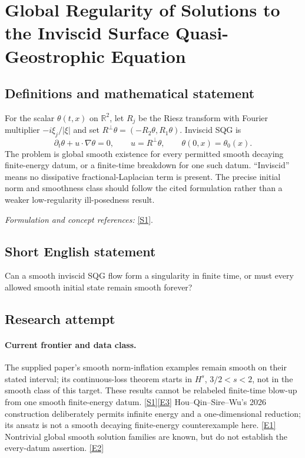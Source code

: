 \documentclass[11pt,a4paper]{article}
\newcommand{\R}{\mathbb{R}}
\newcommand{\sref}[2]{\hyperlink{source:#1:#2}{[S#2]}}
\newcommand{\eref}[2]{\hyperlink{extra:#1:#2}{[E#2]}}
\newif\ifshowcatalogue
\newcommand{\cataloguescope}[1]{\ifshowcatalogue
 \paragraph{Exact scope in the supplied catalogue.}
 \begin{quote}\small #1\end{quote}\fi}
\numberwithin{equation}{section}
\begin{document}
\setcounter{section}{0}
\clearpage
\section*{\texorpdfstring{Global Regularity of Solutions to the Inviscid Surface Quasi-Geostrophic Equation}{Global Regularity of Solutions to the Inviscid Surface Quasi-Geostrophic Equation}}\label{statement}
\subsection{Definitions and mathematical statement}
For the scalar $\theta(t,x)$ on $\R^2$, let $R_j$ be the Riesz transform with Fourier multiplier $-i\xi_j/|\xi|$ and set $R^\perp\theta=(-R_2\theta,R_1\theta)$. Inviscid SQG is
\[
 \partial_t\theta+u\cdot\nabla\theta=0,\qquad u=R^\perp\theta,
 \qquad\theta(0,x)=\theta_0(x).
\]
The problem is global smooth existence for every permitted smooth decaying finite-energy datum, or a finite-time breakdown for one such datum. ``Inviscid'' means no dissipative fractional-Laplacian term is present. The precise initial norm and smoothness class should follow the cited formulation rather than a weaker low-regularity ill-posedness result.
\par\smallskip\textit{Formulation and concept references:} \sref{statement}{1}.
\cataloguescope{For the inviscid SQG equation partial\_t theta + u dot grad theta = 0 on R\textasciicircum{}2, with u = R-perp theta, prove global smooth existence for every sufficiently smooth decaying finite-energy initial datum, or construct such a datum whose solution develops a finite-time singularity.}
\subsection{Short English statement}
Can a smooth inviscid SQG flow form a singularity in finite time, or must every allowed smooth initial state remain smooth forever?
\subsection{Research attempt}

\paragraph{Current frontier and data class.}
The supplied paper's smooth norm-inflation examples remain smooth on their
stated interval; its continuous-loss theorem starts in $H^s$, $3/2<s<2$,
not in the smooth class of this target. These results cannot be relabeled
finite-time blow-up from one smooth finite-energy datum.
\sref{statement}{1}\eref{statement}{3}
Hou--Qin--Sire--Wu's 2026 construction deliberately permits infinite energy
and a one-dimensional reduction; its ansatz is not a smooth decaying
finite-energy counterexample here. \eref{statement}{1}
Nontrivial global smooth solution families are known, but do not establish
the every-datum assertion. \eref{statement}{2}
\end{document}
